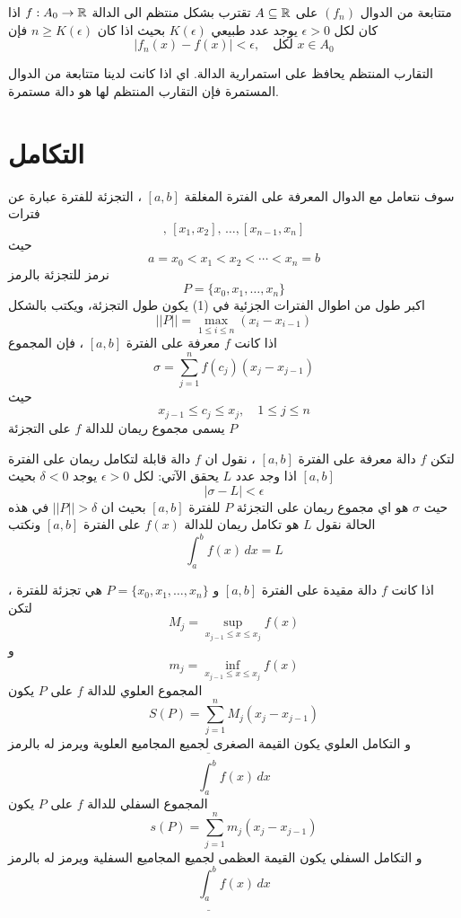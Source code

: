 \begin{definition}
	متتابعة من الدوال $(f_n)$ على $A\subseteq\mathbb{R}$ تقترب بشكل منتظم الى الدالة $f:A_0\to\mathbb{R}$ اذا كان لكل $\epsilon>0$ يوجد عدد طبيعي $K(\epsilon)$ بحيث اذا كان $n\geq K(\epsilon)$ فإن 
	\[
	|f_n(x) - f(x) | < \epsilon, \quad \text{لكل $x\in A_0$}
	\]
\end{definition}

\begin{note}
	التقارب المنتظم يحافظ على استمرارية الدالة. اي اذا كانت لدينا متتابعة من الدوال المستمرة فإن التقارب المنتظم لها هو دالة مستمرة.
\end{note}

\section{التكامل \cite{introrealanal}}

سوف نتعامل مع الدوال المعرفة على الفترة المغلقة $[a, b]$ ، التجزئة للفترة عبارة عن فترات 
\begin{equation}
	[x_0, x_1],\, [x_1, x_2],\, \dots, [x_{n-1}, x_n]
\end{equation}
حيث
\begin{equation}
	a = x_0 < x_1 < x_2 < \cdots < x_n=b
\end{equation}
نرمز للتجزئة بالرمز 
\[
P = \{x_0 , x_1, \dots, x_n\}
\]
اكبر طول من اطوال الفترات الجزئية في (1) يكون طول التجزئة، ويكتب بالشكل
\[
||P|| = \max_{1\leq i \leq n} (x_i - x_{i-1})
\]
اذا كانت $f$ معرفة على الفترة $[a, b]$ ، فإن المجموع
\[
\sigma = \sum_{j=1}^{n} f(c_j) (x_j - x_{j-1})
\]
حيث
\[
x_{j-1} \leq c_j \leq x_j , \quad 1\leq j \leq n
\]
يسمى مجموع ريمان للدالة $f$ على التجزئة $P$

\begin{definition}
	لتكن $f$ دالة معرفة على الفترة $[a, b]$ ، نقول ان $f$ دالة قابلة لتكامل ريمان على الفترة $[a, b]$ اذا وجد عدد $L$ يحقق الآتي: لكل $\epsilon> 0 $ يوجد $\delta < 0 $ بحيث
	\[
	|\sigma - L |< \epsilon
	\]
	حيث $\sigma$ هو اي مجموع ريمان على التجزئة $P$ للفترة $[a, b]$ بحيث ان $||P|| > \delta$ في هذه الحالة نقول $L$ هو تكامل ريمان للدالة $f(x)$ على الفترة $[a, b]$ ونكتب
	\[
	\int_{a}^{b} f(x)\, dx = L
	\]
\end{definition}

\begin{definition}
	اذا كانت $f$ دالة مقيدة على الفترة $[a, b]$ و $P = \{x_0, x_1, \dots, x_n\}$ هي تجزئة للفترة ، لتكن 
	\[
	M_j = \sup_{x_{j-1}\leq x\leq x_j} f(x)
	\]
	و
	\[
	m_j = \inf_{x_{j-1}\leq x\leq x_j} f(x)
	\]
	المجموع العلوي للدالة $f$ على $P$ يكون
	\[
	S(P) = \sum_{j=1}^{n} M_j (x_j - x_{j-1})
	\]
	و التكامل العلوي يكون القيمة الصغرى لجميع المجاميع العلوية ويرمز له بالرمز
	\[
	\overline{
	\int_{a}^{b} 
	}
	f(x)\, dx
	\]
	المجموع السفلي للدالة $f$ على $P$ يكون
	\[
	s(P) = \sum_{j=1}^{n} m_j (x_j - x_{j-1})
	\]
	و التكامل السفلي يكون القيمة العظمى لجميع المجاميع السفلية ويرمز له بالرمز
	\[
	\underline{
		\int_{a}^{b} 
	}
	f(x)\, dx
	\]
\end{definition}

